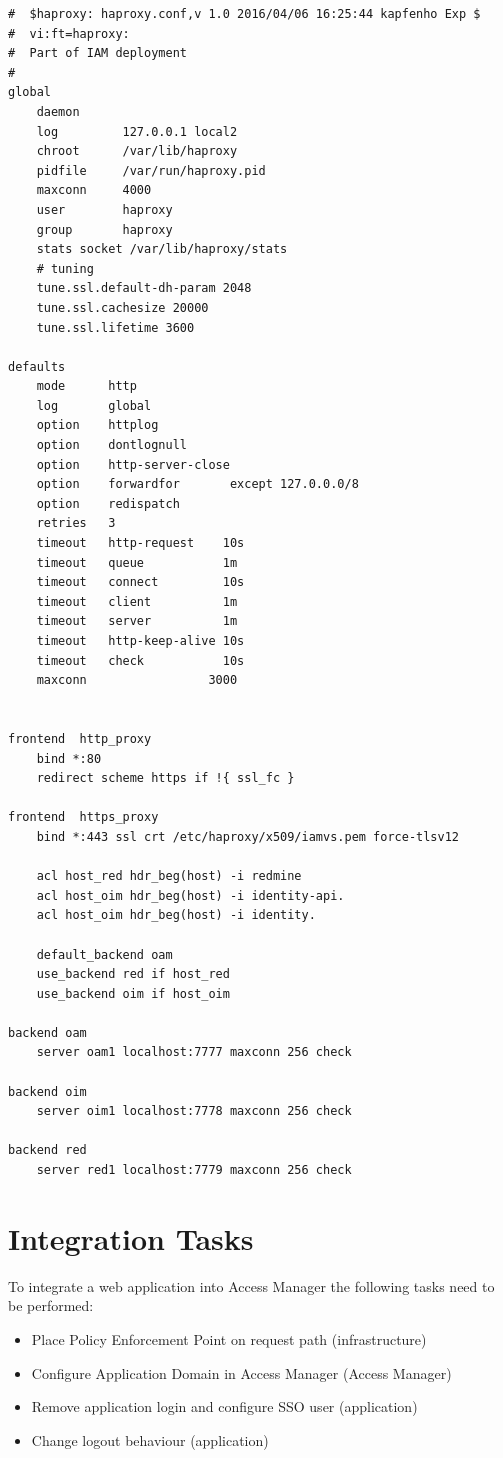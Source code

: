 \documentclass[11pt]{report}
\begin{document}
    \begin{Verbatim}[label=haproxy.conf]
#  $haproxy: haproxy.conf,v 1.0 2016/04/06 16:25:44 kapfenho Exp $
#  vi:ft=haproxy:
#  Part of IAM deployment
#
global
    daemon
    log         127.0.0.1 local2
    chroot      /var/lib/haproxy
    pidfile     /var/run/haproxy.pid
    maxconn     4000
    user        haproxy
    group       haproxy
    stats socket /var/lib/haproxy/stats
    # tuning
    tune.ssl.default-dh-param 2048
    tune.ssl.cachesize 20000
    tune.ssl.lifetime 3600

defaults
    mode      http
    log       global
    option    httplog
    option    dontlognull
    option    http-server-close
    option    forwardfor       except 127.0.0.0/8
    option    redispatch
    retries   3
    timeout   http-request    10s
    timeout   queue           1m
    timeout   connect         10s
    timeout   client          1m
    timeout   server          1m
    timeout   http-keep-alive 10s
    timeout   check           10s
    maxconn                 3000


frontend  http_proxy
    bind *:80
    redirect scheme https if !{ ssl_fc }

frontend  https_proxy
    bind *:443 ssl crt /etc/haproxy/x509/iamvs.pem force-tlsv12

    acl host_red hdr_beg(host) -i redmine
    acl host_oim hdr_beg(host) -i identity-api.
    acl host_oim hdr_beg(host) -i identity.

    default_backend oam
    use_backend red if host_red
    use_backend oim if host_oim

backend oam
    server oam1 localhost:7777 maxconn 256 check

backend oim
    server oim1 localhost:7778 maxconn 256 check

backend red
    server red1 localhost:7779 maxconn 256 check
\end{Verbatim}


\newpage

\section{Integration Tasks}

To integrate a web application into Access Manager the following tasks need to
be performed:

\begin{itemize}

    \item Place Policy Enforcement Point on request path (infrastructure)
    \item Configure Application Domain in Access Manager (Access Manager)
    \item Remove application login and configure SSO user (application)
    \item Change logout behaviour (application)

\end{itemize}
\end{document}
